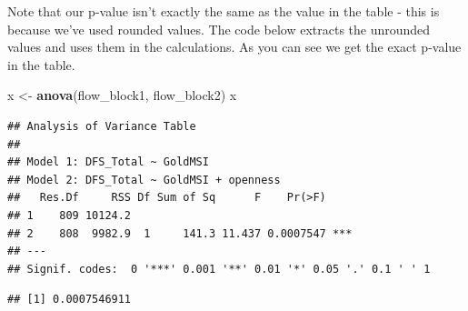 \documentclass[
]{book}
\newenvironment{Shaded}{\begin{snugshade}}{\end{snugshade}}
\newcommand{\AttributeTok}[1]{\textcolor[rgb]{0.13,0.29,0.53}{#1}}
\newcommand{\CommentTok}[1]{\textcolor[rgb]{0.56,0.35,0.01}{\textit{#1}}}
\newcommand{\ConstantTok}[1]{\textcolor[rgb]{0.56,0.35,0.01}{#1}}
\newcommand{\DecValTok}[1]{\textcolor[rgb]{0.00,0.00,0.81}{#1}}
\newcommand{\FunctionTok}[1]{\textcolor[rgb]{0.13,0.29,0.53}{\textbf{#1}}}
\newcommand{\NormalTok}[1]{#1}
\newcommand{\OtherTok}[1]{\textcolor[rgb]{0.56,0.35,0.01}{#1}}
\newcommand{\SpecialCharTok}[1]{\textcolor[rgb]{0.81,0.36,0.00}{\textbf{#1}}}
\begin{document}
Note that our p-value isn't exactly the same as the value in the table - this is because we've used rounded values. The code below extracts the unrounded values and uses them in the calculations. As you can see we get the exact p-value in the table.

\begin{Shaded}
\begin{Highlighting}[]
\NormalTok{x }\OtherTok{\textless{}{-}} \FunctionTok{anova}\NormalTok{(flow\_block1, flow\_block2)}
\NormalTok{x}
\end{Highlighting}
\end{Shaded}

\begin{verbatim}
## Analysis of Variance Table
## 
## Model 1: DFS_Total ~ GoldMSI
## Model 2: DFS_Total ~ GoldMSI + openness
##   Res.Df     RSS Df Sum of Sq      F    Pr(>F)    
## 1    809 10124.2                                  
## 2    808  9982.9  1     141.3 11.437 0.0007547 ***
## ---
## Signif. codes:  0 '***' 0.001 '**' 0.01 '*' 0.05 '.' 0.1 ' ' 1
\end{verbatim}

\begin{Shaded}
\end{Shaded}

\begin{verbatim}
## [1] 0.0007546911
\end{verbatim}

  
\end{document}
